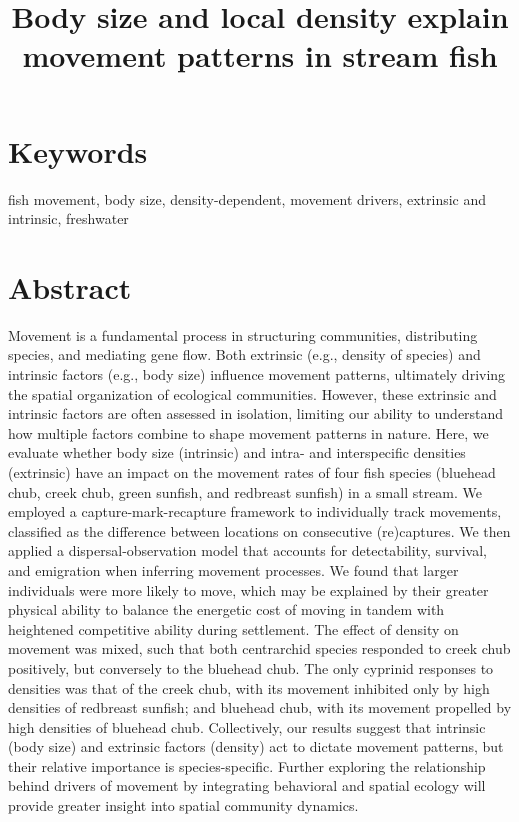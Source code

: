 \documentclass[11pt, class=article, crop=false]{standalone}
\title{Body size and local density explain movement patterns in stream fish}
\date{} %
\author{} %
\begin{document}
\maketitle


\section*{Keywords}

fish movement, body size, density-dependent, movement drivers, extrinsic and intrinsic, freshwater

\section{Abstract}

 Movement is a fundamental process in structuring communities, distributing species, and mediating gene flow. Both extrinsic (e.g., density of species) and intrinsic factors (e.g., body size) influence movement patterns, ultimately driving the spatial organization of ecological communities. However, these extrinsic and intrinsic factors are often assessed in isolation, limiting our ability to understand how multiple factors combine to shape movement patterns in nature. Here, we evaluate whether body size (intrinsic) and intra- and interspecific densities (extrinsic) have an impact on the movement rates of four fish species (bluehead chub, creek chub, green sunfish, and redbreast sunfish) in a small stream. We employed a capture-mark-recapture framework to individually track movements, classified as the difference between locations on consecutive (re)captures. We then applied a dispersal-observation model that accounts for detectability, survival, and emigration when inferring movement processes. We found that larger individuals were more likely to move, which may be explained by their greater physical ability to balance the energetic cost of moving in tandem with heightened competitive ability during settlement. The effect of density on movement was mixed, such that both centrarchid species responded to creek chub positively, but conversely to the bluehead chub. The only cyprinid responses to densities was that of the creek chub, with its movement inhibited only by high densities of redbreast sunfish; and bluehead chub, with its movement propelled by high densities of bluehead chub. Collectively, our results suggest that intrinsic (body size) and extrinsic factors (density) act to dictate movement patterns, but their relative importance is species-specific. Further exploring the relationship behind drivers of movement by integrating behavioral and spatial ecology will provide greater insight into spatial community dynamics.
\end{document}
